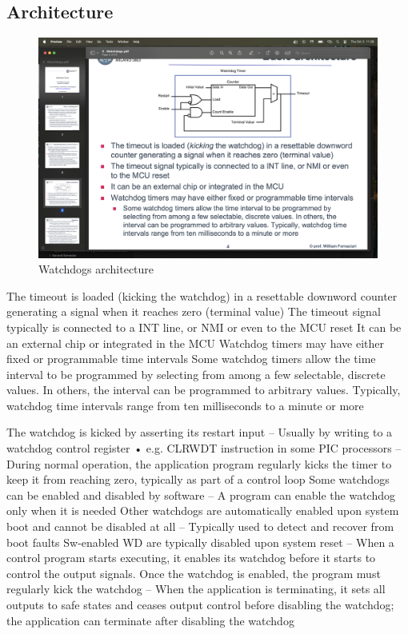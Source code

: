 \subsection{Architecture}
\begin{figure}[H]
    \centering
    \includegraphics[width=0.75\linewidth]{images/wdog.png}
    \caption{Watchdogs architecture}
\end{figure}
The timeout is loaded (kicking the watchdog) in a resettable downword
counter generating a signal when it reaches zero (terminal value)
 The timeout signal typically is connected to a INT line, or NMI or even
to the MCU reset
 It can be an external chip or integrated in the MCU
 Watchdog timers may have either fixed or programmable time intervals
 Some watchdog timers allow the time interval to be programmed by
selecting from among a few selectable, discrete values. In others, the
interval can be programmed to arbitrary values. Typically, watchdog time
intervals range from ten milliseconds to a minute or more


The watchdog is kicked by asserting its restart input
– Usually by writing to a watchdog control register
• e.g. CLRWDT instruction in some PIC processors
– During normal operation, the application program regularly kicks the
timer to keep it from reaching zero, typically as part of a control loop
 Some watchdogs can be enabled and disabled by software
– A program can enable the watchdog only when it is needed
 Other watchdogs are automatically enabled upon system
boot and cannot be disabled at all
– Typically used to detect and recover from boot faults
 Sw-enabled WD are typically disabled upon system reset
– When a control program starts executing, it enables its watchdog
before it starts to control the output signals. Once the watchdog is
enabled, the program must regularly kick the watchdog
– When the application is terminating, it sets all outputs to safe states
and ceases output control before disabling the watchdog; the
application can terminate after disabling the watchdog

